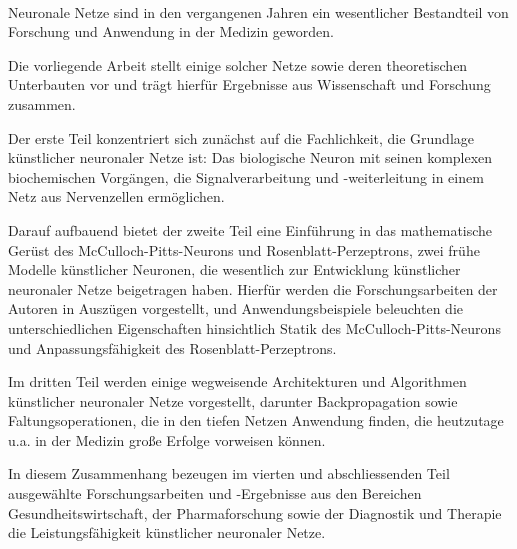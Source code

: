 \kurzfassung

\paragraph*{}

Neuronale Netze sind in den vergangenen Jahren ein wesentlicher Bestandteil von Forschung und Anwendung in der Medizin geworden.

Die vorliegende Arbeit stellt einige solcher Netze sowie deren theoretischen Unterbauten vor und trägt hierfür Ergebnisse aus Wissenschaft und Forschung zusammen.

Der erste Teil konzentriert sich zunächst auf die Fachlichkeit, die Grundlage künstlicher neuronaler Netze ist: Das biologische Neuron mit seinen komplexen biochemischen Vorgängen, die Signalverarbeitung und -weiterleitung in einem Netz aus Nervenzellen ermöglichen.

Darauf aufbauend bietet der zweite Teil eine Einführung in das mathematische Gerüst des McCulloch-Pitts-Neurons und Rosenblatt-Perzeptrons, zwei frühe Modelle künstlicher Neuronen, die wesentlich zur Entwicklung künstlicher neuronaler Netze beigetragen haben.
Hierfür werden die Forschungsarbeiten der Autoren in Auszügen vorgestellt, und Anwendungsbeispiele beleuchten die unterschiedlichen Eigenschaften hinsichtlich Statik des McCulloch-Pitts-Neurons und Anpassungsfähigkeit des Rosenblatt-Perzeptrons.

Im dritten Teil werden einige wegweisende Architekturen und Algorithmen künstlicher neuronaler Netze vorgestellt, darunter Backpropagation sowie Faltungsoperationen, die in den tiefen Netzen Anwendung finden, die heutzutage u.a. in der Medizin große Erfolge vorweisen können.

In diesem Zusammenhang bezeugen im vierten und abschliessenden Teil ausgewählte Forschungsarbeiten und -Ergebnisse aus den Bereichen Gesundheitswirtschaft, der Pharmaforschung sowie der Diagnostik und Therapie die Leistungsfähigkeit künstlicher neuronaler Netze.
